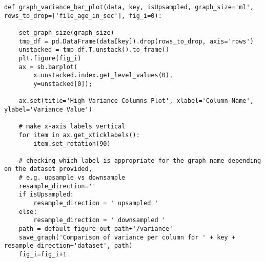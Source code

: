 \begin{code}
\label{code:charting-variance-post-resample}
\begin{verbatim}
def graph_variance_bar_plot(data, key, isUpsampled, graph_size='ml', rows_to_drop=['file_age_in_sec'], fig_i=0):

    set_graph_size(graph_size)
    tmp_df = pd.DataFrame(data[key]).drop(rows_to_drop, axis='rows')
    unstacked = tmp_df.T.unstack().to_frame()
    plt.figure(fig_i)
    ax = sb.barplot(
        x=unstacked.index.get_level_values(0),
        y=unstacked[0]);

    ax.set(title='High Variance Columns Plot', xlabel='Column Name', ylabel='Variance Value')

    # make x-axis labels vertical
    for item in ax.get_xticklabels():
        item.set_rotation(90)
    
    # checking which label is appropriate for the graph name depending on the dataset provided, 
    # e.g. upsample vs downsample    
    resample_direction=''
    if isUpsampled:
        resample_direction = ' upsampled '
    else:
        resample_direction = ' downsampled '
    path = default_figure_out_path+'/variance'
    save_graph('Comparison of variance per column for ' + key + resample_direction+'dataset', path)
    fig_i=fig_i+1
\end{verbatim}
\end{code}
